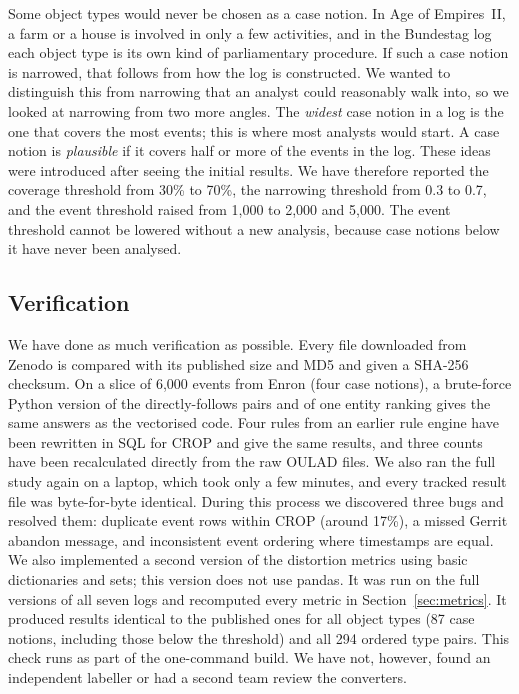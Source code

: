 \documentclass[pdflatex,sn-mathphys-num]{sn-jnl}
\begin{document}
Some object types would never be chosen as a case notion. In Age of Empires~II, a farm or a house is involved in only a few activities, and in the Bundestag log each object type is its own kind of parliamentary procedure. If such a case notion is narrowed, that follows from how the log is constructed. We wanted to distinguish this from narrowing that an analyst could reasonably walk into, so we looked at narrowing from two more angles. The \emph{widest} case notion in a log is the one that covers the most events; this is where most analysts would start. A case notion is \emph{plausible} if it covers half or more of the events in the log. These ideas were introduced after seeing the initial results. We have therefore reported the coverage threshold from 30\% to 70\%, the narrowing threshold from 0.3 to 0.7, and the event threshold raised from 1{,}000 to 2{,}000 and 5{,}000. The event threshold cannot be lowered without a new analysis, because case notions below it have never been analysed.

\subsection{Verification}\label{sec:verification}

We have done as much verification as possible. Every file downloaded from Zenodo is compared with its published size and MD5 and given a SHA-256 checksum. On a slice of 6{,}000 events from Enron (four case notions), a brute-force Python version of the directly-follows pairs and of one entity ranking gives the same answers as the vectorised code. Four rules from an earlier rule engine have been rewritten in SQL for CROP and give the same results, and three counts have been recalculated directly from the raw OULAD files. We also ran the full study again on a laptop, which took only a few minutes, and every tracked result file was byte-for-byte identical. During this process we discovered three bugs and resolved them: duplicate event rows within CROP (around 17\%), a missed Gerrit abandon message, and inconsistent event ordering where timestamps are equal. We also implemented a second version of the distortion metrics using basic dictionaries and sets; this version does not use pandas. It was run on the full versions of all seven logs and recomputed every metric in Section~\ref{sec:metrics}. It produced results identical to the published ones for all object types (87 case notions, including those below the threshold) and all 294 ordered type pairs. This check runs as part of the one-command build. We have not, however, found an independent labeller or had a second team review the converters.
\end{document}
